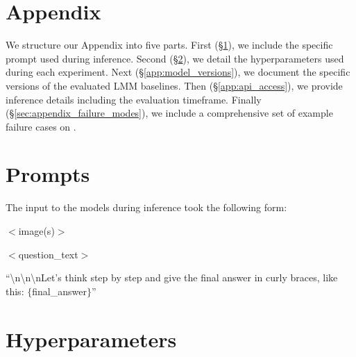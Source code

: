 \onecolumn
\appendix
\section*{Appendix}
\label{sec:appendix}

We structure our Appendix into five parts. First (\S\ref{app:prompt}), we include the specific prompt used during inference. Second (\S\ref{app:hyperparameters}), we detail the hyperparameters used during each experiment. Next (\S\ref{app:model_versions}), we document the specific versions of the evaluated LMM baselines. Then (\S\ref{app:api_access}), we provide inference details including the evaluation timeframe. Finally (\S\ref{sec:appendix_failure_modes}), we include a comprehensive set of example failure cases on \benchmarkName. 

\section{Prompts}
\label{app:prompt}

The input to the models during inference took the following form:

\begin{formattedquote}
    $<$image(s)$>$ 

    $<$question\_text$>$

    ``\textbackslash n\textbackslash n\textbackslash nLet's think step by step and give the final answer in curly braces, like this: $\{$final\_answer$\}$''
    
\end{formattedquote}

\section{Hyperparameters}
\label{app:hyperparameters}


